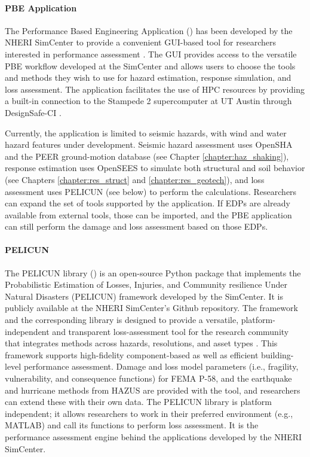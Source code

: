 \paragraph{PBE Application} The Performance Based Engineering Application () has been developed by the NHERI SimCenter to provide a convenient GUI-based tool for researchers interested in performance assessment \citep{zsarnoczay2019PBE}. The GUI provides access to the versatile PBE workflow developed at the SimCenter and allows users to choose the tools and methods they wish to use for hazard estimation, response simulation, and loss assessment. The application facilitates the use of HPC resources by providing a built-in connection to the Stampede 2 supercomputer at UT Austin through DesignSafe-CI \citep{rathje2017designsafe}.

Currently, the application is limited to seismic hazards, with wind and water hazard features under development. Seismic hazard assessment uses OpenSHA and the PEER ground-motion database (see Chapter \ref{chapter:haz_shaking}), response estimation uses OpenSEES to simulate both structural and soil behavior (see Chapters \ref{chapter:res_struct} and \ref{chapter:res_geotech}), and loss assessment uses PELICUN (see below) to perform the calculations. Researchers can expand the set of tools supported by the application. If EDPs are already available from external tools, those can be imported, and the PBE application can still perform the damage and loss assessment based on those EDPs.

\paragraph{PELICUN} The PELICUN library () is an open-source Python package that implements the Probabilistic Estimation of Losses, Injuries, and Community resilience Under Natural Disasters (PELICUN) framework developed by the SimCenter. It is publicly available at the NHERI SimCenter's Github repository. The framework and the corresponding library is designed to provide a versatile, platform-independent and transparent loss-assessment tool for the research community that integrates methods across hazards, resolutions, and asset types \citep{zsarnoczay2020pelicun}. This framework supports high-fidelity component-based as well as efficient building-level performance assessment. Damage and loss model parameters (i.e., fragility, vulnerability, and consequence functions) for FEMA P-58, and the earthquake and hurricane methods from HAZUS are provided with the tool, and researchers can extend these with their own data. The PELICUN library is platform independent; it allows researchers to work in their preferred environment (e.g., MATLAB) and call its functions to perform loss assessment. It is the performance assessment engine behind the applications developed by the NHERI SimCenter.

